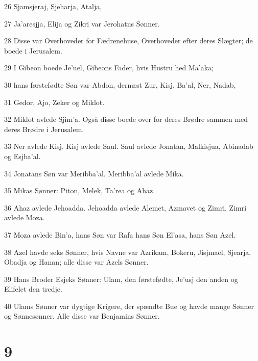 \par 26 Sjamsjeraj, Sjeharja, Atalja,
\par 27 Ja'aresjja, Elija og Zikri var Jerohatns Sønner.
\par 28 Disse var Overhoveder for Fædrenehuse, Overhoveder efter deres Slægter; de boede i Jerusalem.
\par 29 I Gibeon boede Je'uel, Gibeons Fader, hvis Hustru hed Ma'aka;
\par 30 hans førstefødte Søn var Abdon, dernæst Zur, Kisj, Ba'al, Ner, Nadab,
\par 31 Gedor, Ajo, Zeker og Miklot.
\par 32 Miklot avlede Sjim'a. Også disse boede over for deres Brødre sammen med deres Brødre i Jerusalem.
\par 33 Ner avlede Kisj. Kisj avlede Saul. Saul avlede Jonatan, Malkisjua, Abinadab og Esjba'al.
\par 34 Jonatans Søn var Meribba'al. Meribba'al avlede Mika.
\par 35 Mikas Sønner: Piton, Melek, Ta'rea og Ahaz.
\par 36 Ahaz avlede Jehoadda. Jehoadda avlede Alemet, Azmavet og Zimri. Zimri avlede Moza.
\par 37 Moza avlede Bin'a, hans Søn var Rafa hans Søn El'asa, hans Søn Azel.
\par 38 Azel havde seks Sønner, hvis Navne var Azrikam, Bokeru, Jisjmael, Sjearja, Obadja og Hanan; alle disse var Azels Sønner.
\par 39 Hans Broder Esjeks Sønner: Ulam, den førstefødte, Je'usj den anden og Elifelet den tredje.
\par 40 Ulams Sønner var dygtige Krigere, der spændte Bue og havde mange Sønner og Sønnesønner. Alle disse var Benjamins Sønner.

\chapter{9}

